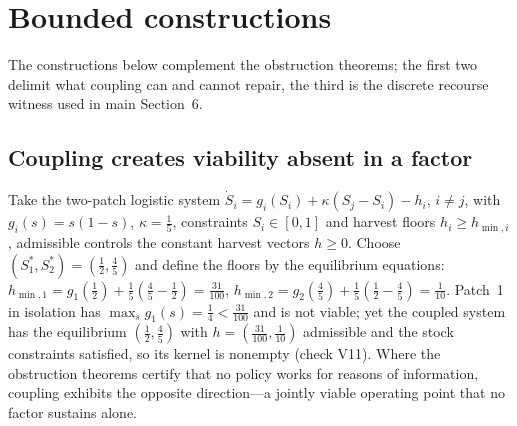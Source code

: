 \section{Bounded constructions}\label{S:constructions}

The constructions below complement the obstruction theorems; the first two delimit what coupling can and cannot repair, the third is the discrete recourse witness used in main Section~6.

\subsection{Coupling creates viability absent in a factor}\label{S:A1}
Take the two-patch logistic system $\dot S_i=g_i(S_i)+\kappa(S_j-S_i)-h_i$, $i\ne j$, with $g_i(s)=s(1-s)$, $\kappa=\tfrac15$, constraints $S_i\in[0,1]$ and harvest floors $h_i\ge h_{\min,i}$, admissible controls the constant harvest vectors $h\ge0$. Choose $(S_1^*,S_2^*)=(\tfrac12,\tfrac45)$ and define the floors by the equilibrium equations: $h_{\min,1}=g_1(\tfrac12)+\tfrac15(\tfrac45-\tfrac12)=\tfrac{31}{100}$, $h_{\min,2}=g_2(\tfrac45)+\tfrac15(\tfrac12-\tfrac45)=\tfrac1{10}$. Patch~1 in isolation has $\max_sg_1(s)=\tfrac14<\tfrac{31}{100}$ and is not viable; yet the coupled system has the equilibrium $(\tfrac12,\tfrac45)$ with $h=(\tfrac{31}{100},\tfrac1{10})$ admissible and the stock constraints satisfied, so its kernel is nonempty (check V11). Where the obstruction theorems certify that no policy works for reasons of information, coupling exhibits the opposite direction---a jointly viable operating point that no factor sustains alone.

